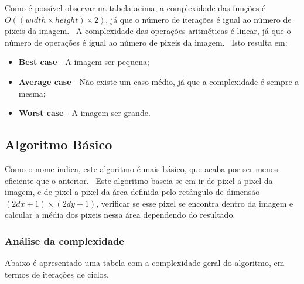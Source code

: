     \newpage

    \par Como é possível observar na tabela acima, a complexidade das funções é $O((width \times height) \times 2)$, já que o número de iterações é igual ao número de pixeis da imagem. \ A complexidade das operações aritméticas é linear, já que o número de operações é igual ao número de pixeis da imagem. \ Isto resulta em:

    \begin{itemize}
        \item \textbf{Best case} - A imagem ser pequena;
        \item \textbf{Average case} - Não existe um caso médio, já que a complexidade é sempre a mesma;
        \item \textbf{Worst case} - A imagem ser grande.
    \end{itemize}

\subsection{Algoritmo Básico}\label{subsec:blur2}
    \par Como o nome indica, este algoritmo é mais básico, que acaba por ser menos eficiente que o anterior. \ Este algoritmo baseia-se em ir de pixel a pixel da imagem, e de pixel a pixel da área definida pelo retângulo de dimensão $(2dx + 1) \times (2dy + 1)$, verificar se esse pixel se encontra dentro da imagem e calcular a média dos pixeis nessa área dependendo do resultado.

\subsubsection{Análise da complexidade}
    \par Abaixo é apresentado uma tabela com a complexidade geral do algoritmo, em termos de iterações de ciclos.

